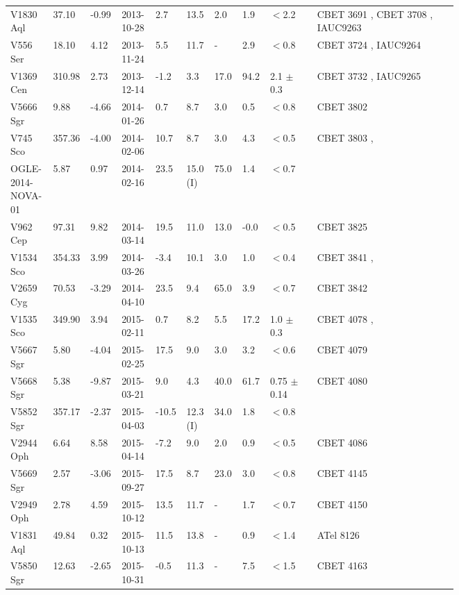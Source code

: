 \begin{landscape}
\begin{tiny}
\begin{table*}[!t]
\begin{tabular}{ L{0.07\linewidth} p{0.03\linewidth}  p{0.04\linewidth} p{0.07\linewidth} p{0.03\linewidth} p{0.04\linewidth} p{0.04\linewidth} p{0.03\linewidth} p{0.1\linewidth}  L{0.3\linewidth} }
V1830 Aql & 37.10 & -0.99 & 2013-10-28 & 2.7 & 13.5 & 2.0 & 1.9 & $<$2.2 & CBET 3691 \citep{CBET3691}, CBET 3708 \citep{CBET3708}, IAUC9263 \citep{IAUC9263}\\
V556 Ser & 18.10 & 4.12 & 2013-11-24 & 5.5 & 11.7 & - & 2.9 & $<$0.8 & CBET 3724 \citep{CBET3724}, IAUC9264 \citep{IAUC9264}\\
V1369 Cen & 310.98 & 2.73 & 2013-12-14 & -1.2 & 3.3 & 17.0 & 94.2 & 2.1 $\pm$ 0.3 & CBET 3732 \citep{CBET3732}, IAUC9265 \citep{IAUC9265}\\
V5666 Sgr & 9.88 & -4.66 & 2014-01-26 & 0.7 & 8.7 & 3.0 & 0.5 & $<$0.8 & CBET 3802 \citep{CBET3802}\\
V745 Sco & 357.36 & -4.00 & 2014-02-06 & 10.7 & 8.7 & 3.0 & 4.3 & $<$0.5 & CBET 3803 \citep{CBET3803},\citep{ OGLEREF1}\\
OGLE-2014-NOVA-01 & 5.87 & 0.97 & 2014-02-16 & 23.5 & 15.0 (I) & 75.0 & 1.4 & $<$0.7 & \citep{OGLEREF2}\\
V962 Cep & 97.31 & 9.82 & 2014-03-14 & 19.5 & 11.0 & 13.0 & -0.0 & $<$0.5 & CBET 3825 \citep{CBET3825}\\
V1534 Sco & 354.33 & 3.99 & 2014-03-26 & -3.4 & 10.1 & 3.0 & 1.0 & $<$0.4 & CBET 3841 \citep{CBET3841},\citep{2017MNRAS.469.4341M}\\
V2659 Cyg & 70.53 & -3.29 & 2014-04-10 & 23.5 & 9.4 & 65.0 & 3.9 & $<$0.7 & CBET 3842 \citep{CBET3842}\\
V1535 Sco & 349.90 & 3.94 & 2015-02-11 & 0.7 & 8.2 & 5.5 & 17.2 & 1.0 $\pm$ 0.3 & CBET 4078 \citep{CBET4078},\citep{2017MNRAS.469.4341M}\\
V5667 Sgr & 5.80 & -4.04 & 2015-02-25 & 17.5 & 9.0 & 3.0 & 3.2 & $<$0.6 & CBET 4079 \citep{CBET4079}\\
V5668 Sgr & 5.38 & -9.87 & 2015-03-21 & 9.0 & 4.3 & 40.0 & 61.7 & 0.75 $\pm$ 0.14 & CBET 4080 \citep{CBET4080}\\
V5852 Sgr & 357.17 & -2.37 & 2015-04-03 & -10.5 & 12.3 (I) & 34.0 & 1.8 & $<$0.8 & \citep{OGLEREF3}\\
V2944 Oph & 6.64 & 8.58 & 2015-04-14 & -7.2 & 9.0 & 2.0 & 0.9 & $<$0.5 & CBET 4086 \citep{CBET4086}\\
V5669 Sgr & 2.57 & -3.06 & 2015-09-27 & 17.5 & 8.7 & 23.0 & 3.0 & $<$0.8 & CBET 4145 \citep{CBET4145}\\
V2949 Oph & 2.78 & 4.59 & 2015-10-12 & 13.5 & 11.7 & - & 1.7 & $<$0.7 & CBET 4150 \citep{CBET4150}\\
V1831 Aql & 49.84 & 0.32 & 2015-10-13 & 11.5 & 13.8 & - & 0.9 & $<$1.4 & ATel 8126 \citep{ATel8126}\\
V5850 Sgr & 12.63 & -2.65 & 2015-10-31 & -0.5 & 11.3 & - & 7.5 & $<$1.5 & CBET 4163 \citep{CBET4163}\\
\hline
\hline
\end{tabular}
\end{table*}

\end{tiny}
\end{landscape}

